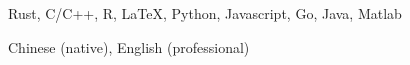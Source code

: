 \begin{cvskills}

   {Rust, C/C++, R, \LaTeX, Python, Javascript, Go, Java,
    Matlab}

   {Chinese (native), English (professional)}

\end{cvskills}

